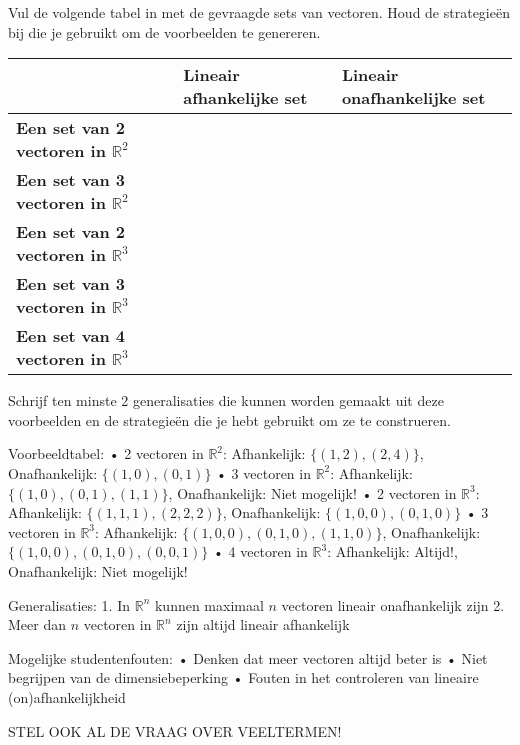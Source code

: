 \documentclass{ximera}
\begin{document}
\begin{problem}
Vul de volgende tabel in met de gevraagde sets van vectoren. Houd de strategieën bij die je gebruikt om de voorbeelden te genereren.

\begin{center}
\begin{tabular}{|p{4cm}|p{4cm}|p{4cm}|}
\hline
& \textbf{Lineair afhankelijke set} & \textbf{Lineair onafhankelijke set} \\
\hline
\textbf{Een set van 2 vectoren in $\mathbb{R}^2$} & & \\
\hline
\textbf{Een set van 3 vectoren in $\mathbb{R}^2$} & & \\
\hline
\textbf{Een set van 2 vectoren in $\mathbb{R}^3$} & & \\
\hline
\textbf{Een set van 3 vectoren in $\mathbb{R}^3$} & & \\
\hline
\textbf{Een set van 4 vectoren in $\mathbb{R}^3$} & & \\
\hline
\end{tabular}
\end{center}

Schrijf ten minste 2 generalisaties die kunnen worden gemaakt uit deze voorbeelden en de strategieën die je hebt gebruikt om ze te construeren.

\begin{freeResponse}
Voorbeeldtabel:
• 2 vectoren in $\mathbb{R}^2$: Afhankelijk: $\{(1,2), (2,4)\}$, Onafhankelijk: $\{(1,0), (0,1)\}$
• 3 vectoren in $\mathbb{R}^2$: Afhankelijk: $\{(1,0), (0,1), (1,1)\}$, Onafhankelijk: Niet mogelijk!
• 2 vectoren in $\mathbb{R}^3$: Afhankelijk: $\{(1,1,1), (2,2,2)\}$, Onafhankelijk: $\{(1,0,0), (0,1,0)\}$
• 3 vectoren in $\mathbb{R}^3$: Afhankelijk: $\{(1,0,0), (0,1,0), (1,1,0)\}$, Onafhankelijk: $\{(1,0,0), (0,1,0), (0,0,1)\}$
• 4 vectoren in $\mathbb{R}^3$: Afhankelijk: Altijd!, Onafhankelijk: Niet mogelijk!

Generalisaties:
1. In $\mathbb{R}^n$ kunnen maximaal $n$ vectoren lineair onafhankelijk zijn
2. Meer dan $n$ vectoren in $\mathbb{R}^n$ zijn altijd lineair afhankelijk

Mogelijke studentenfouten:
• Denken dat meer vectoren altijd beter is
• Niet begrijpen van de dimensiebeperking
• Fouten in het controleren van lineaire (on)afhankelijkheid
\end{freeResponse}
\end{problem}

STEL OOK AL DE VRAAG OVER VEELTERMEN!
\end{document}
